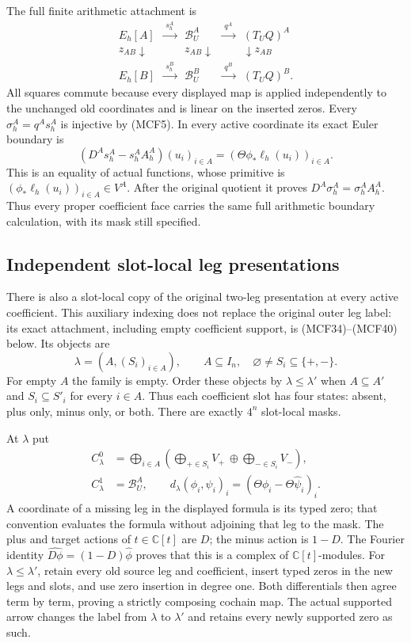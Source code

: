 The full finite arithmetic attachment is
\[
\begin{array}{ccccc}
E_h[A]&\xrightarrow{\ s_h^A\ }&\mathscr B_U^A
       &\xrightarrow{\ q^A\ }&(T_UQ)^A\\
z_{AB}\downarrow&&z_{AB}\downarrow&&\downarrow z_{AB}\\
E_h[B]&\xrightarrow{\ s_h^B\ }&\mathscr B_U^B
       &\xrightarrow{\ q^B\ }&(T_UQ)^B.
\end{array}
\tag{MCF9}
\]
All squares commute because every displayed map is applied independently
to the unchanged old coordinates and is linear on the inserted zeros.
Every $\sigma_h^A=q^As_h^A$ is injective by (MCF5).  In every active
coordinate its exact Euler boundary is
\[
(D^As_h^A-s_h^AA_h^A)(u_i)_{i\in A}
 =(\Theta\phi_*\ell_h(u_i))_{i\in A}.
\tag{MCF10}
\]
This is an equality of actual functions, whose primitive is
$(\phi_*\ell_h(u_i))_{i\in A}\in V^A$.
After the original quotient it proves $D^A\sigma_h^A=\sigma_h^AA_h^A$.
Thus every proper coefficient face carries the same full arithmetic
boundary calculation, with its mask still specified.

\subsection{Independent slot-local leg presentations}

There is also a slot-local copy of the original two-leg presentation at
every active coefficient.  This auxiliary indexing does not replace the
original outer leg label: its exact attachment, including empty coefficient
support, is (MCF34)--(MCF40) below.  Its objects are
\[
\lambda=(A,(S_i)_{i\in A}),\qquad
A\subseteq I_n,\quad\varnothing\ne S_i\subseteq\{+,-\}.
\tag{MCF11}
\]
For empty $A$ the family is empty.  Order these objects by
$\lambda\leq\lambda'$ when $A\subseteq A'$ and $S_i\subseteq S'_i$
for every $i\in A$.  Thus each coefficient slot has four states: absent,
plus only, minus only, or both.  There are exactly $4^n$ slot-local masks.

At $\lambda$ put
\[
\begin{split}
C_\lambda^0&=\bigoplus_{i\in A}
   \left(\bigoplus_{+\in S_i}V_+\ \oplus\!
                         \bigoplus_{-\in S_i}V_-\right),\\
C_\lambda^1&=\mathscr B_U^A,\qquad
d_\lambda(\phi_i,\psi_i)_i
       =(\Theta\phi_i-\Theta\widehat\psi_i)_i.
\end{split}
\tag{MCF12}
\]
A coordinate of a missing leg in the displayed formula is its typed zero;
that convention evaluates the formula without adjoining that leg to the
mask.  The plus and target actions of $t\in\mathbb C[t]$ are $D$; the
minus action is $1-D$.  The Fourier identity
$\widehat{D\phi}=(1-D)\widehat\phi$ proves that this is a complex of
$\mathbb C[t]$-modules.  For $\lambda\leq\lambda'$, retain every old
source leg and coefficient, insert typed zeros in the new legs and slots,
and use zero insertion in degree one.  Both differentials then agree
term by term, proving a strictly composing cochain map.  The actual
supported arrow changes the label from $\lambda$ to $\lambda'$ and
retains every newly supported zero as such.

